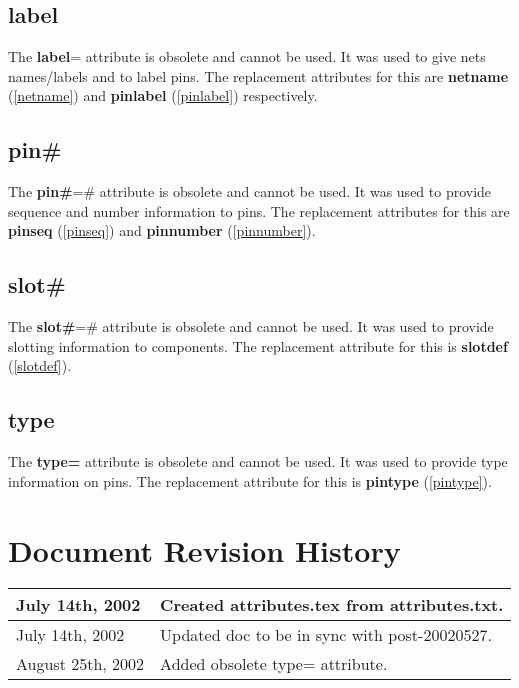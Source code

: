 \documentclass{article}
\begin{document}
\subsection{{\bf label}\label{label}}
The {\bf label}= attribute is obsolete and cannot be used.  It was 
used to give nets names/labels and to label pins.  The replacement
attributes for this are {\bf netname} (\ref{netname}) and 
{\bf pinlabel} (\ref{pinlabel}) respectively.


\subsection{{\bf pin\#}\label{pinPOUND}}
The {\bf pin\#}=\# attribute is obsolete and cannot be used.  It was
used to provide sequence and number information to pins.  The replacement
attributes for this are {\bf pinseq} (\ref{pinseq}) and {\bf pinnumber}
(\ref{pinnumber}).


\subsection{{\bf slot\#}\label{slotPOUND}}
The {\bf slot\#}=\# attribute is obsolete and cannot be used.  It was
used to provide slotting information to components.  The replacement
attribute for this is {\bf slotdef} (\ref{slotdef}).


\subsection{{\bf type}\label{type}}
The {\bf type=} attribute is obsolete and cannot be used.  It was
used to provide type information on pins. The replacement
attribute for this is {\bf pintype} (\ref{pintype}).


\newpage
\section{Document Revision History}

\begin{table}[h]
\begin{tabular}{|l|l|} \hline
July 14th, 2002 & Created attributes.tex from attributes.txt. \\ \hline
July 14th, 2002 & Updated doc to be in sync with post-20020527. \\ \hline
August 25th, 2002 & Added obsolete type= attribute. \\ \hline

\end{tabular}
\end{table}
\end{document}
